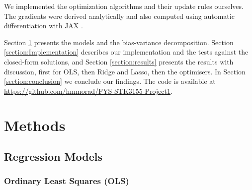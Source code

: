 \documentclass[amssymb,twocolumn,aps]{revtex4}
\begin{document}
We implemented the optimization algorithms and their update rules ourselves. The gradients were derived analytically and also computed using automatic differentiation with JAX \cite{jax}.

Section \ref{section:methods} presents the models and the bias-variance decomposition. Section \ref{section:Implementation} describes our implementation and the tests against the closed-form solutions, and Section \ref{section:results} presents the results with discussion, first for OLS, then Ridge and Lasso, then the optimisers. In Section \ref{section:conclusion} we conclude our findings. The code is available at \url{https://github.com/hmmorad/FYS-STK3155-Project1}.


\section{Methods}\label{section:methods}
\subsection{Regression Models}
\subsubsection{Ordinary Least Squares (OLS)}
\end{document}
